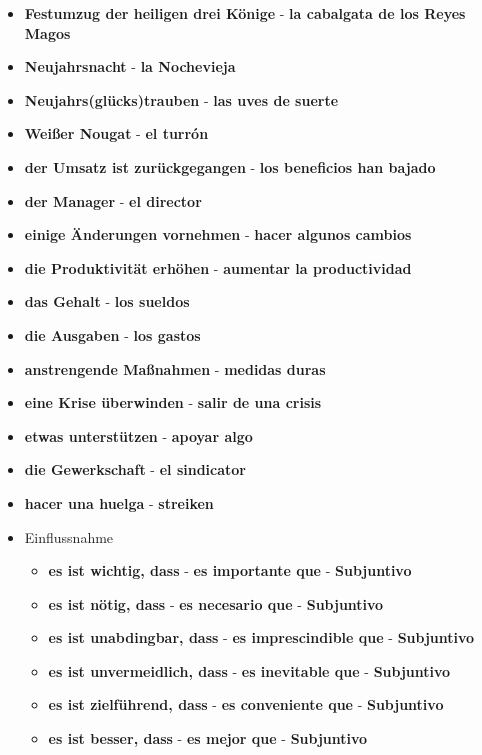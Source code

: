 \documentclass{article}
\begin{document}
\begin{multicols}{2}
\begin{itemize}
		\item{\textbf{Festumzug der heiligen drei Könige} - \textbf{la cabalgata de los Reyes Magos}}
		\item{\textbf{Neujahrsnacht} - \textbf{la Nochevieja}}
		\item{\textbf{Neujahrs(glücks)trauben} - \textbf{las uves de suerte}}
		\item{\textbf{Weißer Nougat} - \textbf{el turrón}}
		\item{\textbf{der Umsatz ist zurückgegangen} - \textbf{los beneficios han bajado}}
		\item{\textbf{der Manager} - \textbf{el director}}
		\item{\textbf{einige Änderungen vornehmen} - \textbf{hacer algunos cambios}}
		\item{\textbf{die Produktivität erhöhen} - \textbf{aumentar la productividad}}
		\item{\textbf{das Gehalt} - \textbf{los sueldos}}
		\item{\textbf{die Ausgaben} - \textbf{los gastos}}
		\item{\textbf{anstrengende Maßnahmen} - \textbf{medidas duras}}
		\item{\textbf{eine Krise überwinden} - \textbf{salir de una crisis}}
		\item{\textbf{etwas unterstützen} - \textbf{apoyar algo}}
		\item{\textbf{die Gewerkschaft} - \textbf{el sindicator}}
		\item{\textbf{hacer una huelga} - \textbf{streiken}}
	\end{itemize}
	\newpage
	\begin{itemize}
		\item{Einflussnahme}
		\begin{itemize}
			\item{\textbf{es ist wichtig, dass} - \textbf{es importante que} - \textbf{Subjuntivo}}
			\item{\textbf{es ist nötig, dass} - \textbf{es necesario que} - \textbf{Subjuntivo}}
			\item{\textbf{es ist unabdingbar, dass} - \textbf{es imprescindible que} - \textbf{Subjuntivo}}
			\item{\textbf{es ist unvermeidlich, dass} - \textbf{es inevitable que} - \textbf{Subjuntivo}}
			\item{\textbf{es ist zielführend, dass} - \textbf{es conveniente que} - \textbf{Subjuntivo}}
			\item{\textbf{es ist besser, dass} - \textbf{es mejor que} - \textbf{Subjuntivo}}

\end{itemize}
\end{itemize}
\end{multicols}
\end{document}
